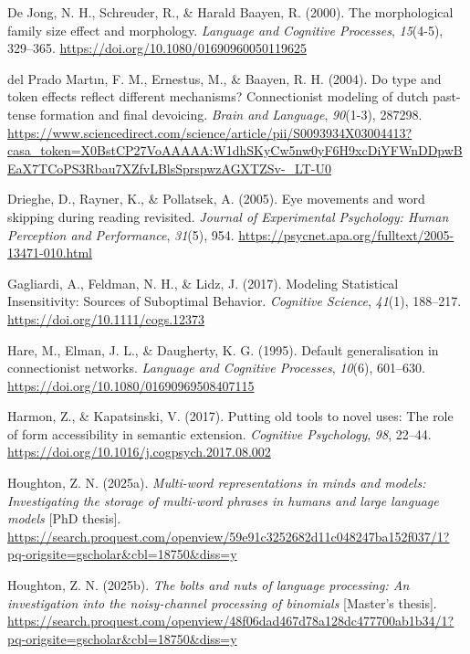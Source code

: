 \documentclass[
  letterpaper,
  DIV=11,
  numbers=noendperiod]{scrartcl}
\newlength{\cslhangindent}
\newenvironment{CSLReferences}[2] %
 {\begin{list}{}{%
  \setlength{\itemindent}{0pt}
  \setlength{\leftmargin}{0pt}
  \setlength{\parsep}{0pt}
  \ifodd #1
   \setlength{\leftmargin}{\cslhangindent}
   \setlength{\itemindent}{-1\cslhangindent}
  \fi
  \setlength{\itemsep}{#2\baselineskip}}}
 {\end{list}}
\begin{document}
\begin{CSLReferences}{1}{0}
De Jong, N. H., Schreuder, R., \& Harald Baayen, R. (2000). The
morphological family size effect and morphology. \emph{Language and
Cognitive Processes}, \emph{15}(4-5), 329--365.
\url{https://doi.org/10.1080/01690960050119625}

del Prado Martın, F. M., Ernestus, M., \& Baayen, R. H. (2004). Do type
and token effects reflect different mechanisms? Connectionist modeling
of dutch past-tense formation and final devoicing. \emph{Brain and
Language}, \emph{90}(1-3), 287298.
\url{https://www.sciencedirect.com/science/article/pii/S0093934X03004413?casa_token=X0BstCP27VoAAAAA:W1dhSKyCw5nw0yF6H9xcDiYFWnDDpwBEaX7TCoPS3Rbau7XZfvLBlsSprspwzAGXTZSv-_LT-U0}

Drieghe, D., Rayner, K., \& Pollatsek, A. (2005). Eye movements and word
skipping during reading revisited. \emph{Journal of Experimental
Psychology: Human Perception and Performance}, \emph{31}(5), 954.
\url{https://psycnet.apa.org/fulltext/2005-13471-010.html}

Gagliardi, A., Feldman, N. H., \& Lidz, J. (2017). Modeling Statistical
Insensitivity: Sources of Suboptimal Behavior. \emph{Cognitive Science},
\emph{41}(1), 188--217. \url{https://doi.org/10.1111/cogs.12373}

Hare, M., Elman, J. L., \& Daugherty, K. G. (1995). Default
generalisation in connectionist networks. \emph{Language and Cognitive
Processes}, \emph{10}(6), 601--630.
\url{https://doi.org/10.1080/01690969508407115}

Harmon, Z., \& Kapatsinski, V. (2017). Putting old tools to novel uses:
The role of form accessibility in semantic extension. \emph{Cognitive
Psychology}, \emph{98}, 22--44.
\url{https://doi.org/10.1016/j.cogpsych.2017.08.002}

Houghton, Z. N. (2025a). \emph{Multi-word representations in minds and
models: Investigating the storage of multi-word phrases in humans and
large language models} {[}PhD thesis{]}.
\url{https://search.proquest.com/openview/59e91c3252682d11c048247ba152f037/1?pq-origsite=gscholar&cbl=18750&diss=y}

Houghton, Z. N. (2025b). \emph{The bolts and nuts of language
processing: An investigation into the noisy-channel processing of
binomials} {[}Master's thesis{]}.
\url{https://search.proquest.com/openview/48f06dad467d78a128dc477700ab1b34/1?pq-origsite=gscholar&cbl=18750&diss=y}


\end{CSLReferences}
\end{document}
